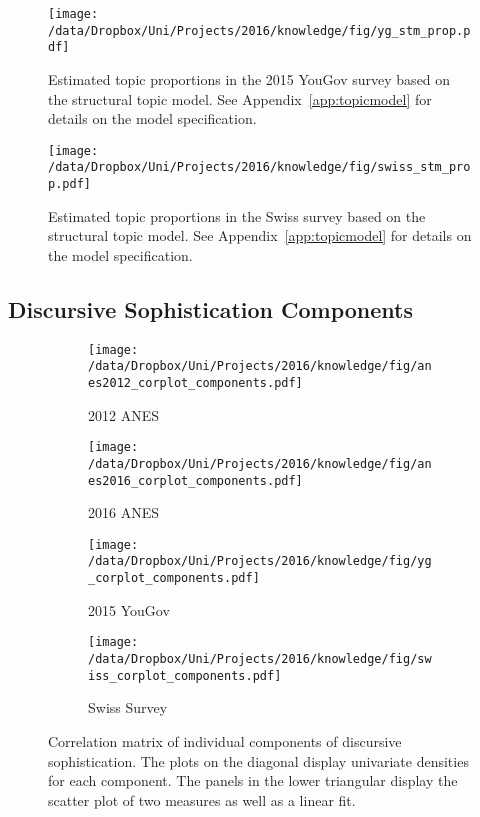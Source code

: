 \begin{figure}[h]\centering
\texttt{[image: /data/Dropbox/Uni/Projects/2016/knowledge/fig/yg\_stm\_prop.pdf]}
\caption[Estimated topic proportions in the 2015 YouGov survey based on the structural topic model]{Estimated topic proportions in the 2015 YouGov survey based on the structural topic model. See Appendix~\ref{app:topicmodel} for details on the model specification.}\label{fig:yg_stm_prop}
\end{figure}

\begin{figure}[h]\centering
\texttt{[image: /data/Dropbox/Uni/Projects/2016/knowledge/fig/swiss\_stm\_prop.pdf]}
\caption[Estimated topic proportions in the Swiss survey based on the structural topic model]{Estimated topic proportions in the Swiss survey based on the structural topic model. See Appendix~\ref{app:topicmodel} for details on the model specification.}\label{fig:swiss_stm_prop}
\end{figure}


\clearpage
\subsection{Discursive Sophistication Components}
\begin{figure*}[h]
    \centering
    \begin{subfigure}[h]{0.4\textwidth}
        \centering
        \texttt{[image: /data/Dropbox/Uni/Projects/2016/knowledge/fig/anes2012\_corplot\_components.pdf]}
        \caption{2012 ANES}
    \end{subfigure}%
    \begin{subfigure}[h]{0.4\textwidth}
         \centering
         \texttt{[image: /data/Dropbox/Uni/Projects/2016/knowledge/fig/anes2016\_corplot\_components.pdf]}
         \caption{2016 ANES}
    \end{subfigure}%
    
    \begin{subfigure}[h]{0.4\textwidth}
        \centering
        \texttt{[image: /data/Dropbox/Uni/Projects/2016/knowledge/fig/yg\_corplot\_components.pdf]}
        \caption{2015 YouGov}
    \end{subfigure}%
    \begin{subfigure}[h]{0.4\textwidth}
         \centering
         \texttt{[image: /data/Dropbox/Uni/Projects/2016/knowledge/fig/swiss\_corplot\_components.pdf]}
         \caption{Swiss Survey}
    \end{subfigure}
    \caption[Correlation matrix of individual components of discursive sophistication.]{Correlation matrix of individual components of discursive sophistication. The plots on the diagonal display univariate densities for each component. The panels in the lower triangular display the scatter plot of two measures as well as a linear fit. %
     }\label{fig:components}
\end{figure*}



